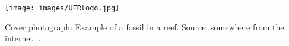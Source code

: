\documentclass[11pt,twoside,openright,a4paper,final]{report}
\begin{document}
\vfill* %
\hspace{-3cm}\texttt{[image: images/UFRlogo.jpg]}


\newpage
Cover photograph: Example of a fossil in a reef. Source: somewhere from the internet ...

\newpage

\pagestyle{plain}

\tableofcontents



\newpage


\frenchspacing %
\end{document}
